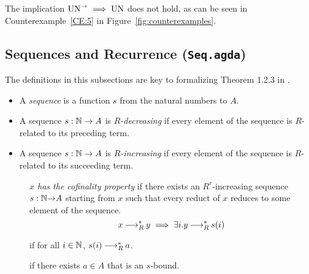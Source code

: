 \begin{remark}
    The implication $\mathrm{UN}^{\to} \implies \mathrm{UN}$ does not hold, as can be seen in Counterexample~\ref{CE:5} in Figure~\ref{fig:counterexamples}.
\end{remark}

\subsection{Sequences and Recurrence (\texttt{Seq.agda})}
The definitions in this subsections are key to formalizing Theorem 1.2.3 in \terese.

\begin{definition} \label{def:seq} \hfill
  \begin{itemize}
    \item A \emph{sequence} is a function $s$ from the natural numbers to $A$.
    \item A sequence $s : \mathbb{N} \to A$ is \emph{$R$-decreasing} if every element of the sequence is $R$-related to its preceding term.
    \item A sequence $s : \mathbb{N} \to A$ is \emph{$R$-increasing} if every element of the sequence is $R$-related to its succeeding term.
  \end{itemize}
\end{definition}

\begin{definition}\hfill
    \begin{description}
        \item[] \emph{$x$ has the cofinality property} if there exists an $R^r$-increasing sequence
        \mbox{$s : \mathbb{N} {\to} A$} starting from $x$ such that every
        reduct of $x$ reduces to some element of the sequence.
        \[ x \mathbin{\longrightarrow_R^*} y \implies \exists i. y \mathbin{\longrightarrow_R^*} s(i) \]
    \end{description}
\end{definition}

\begin{definition} \label{def:bound} \hfill
  \begin{description}
    \item[] if for all $i \in \mathbb{N}$, $s (i) \mathbin{\longrightarrow_R^*} a$.
    \item[] if there exists $a \in A$ that is an $s$-bound.
  \end{description}
\end{definition}

